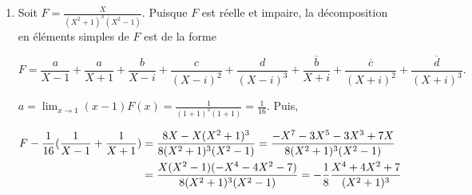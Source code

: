 {{\begin{enumerate}
Puis,

\begin{align*}\ensuremath
d&=\lim_{z \rightarrow i\sqrt{2}}(z-i\sqrt{2})F(z)=\frac{(i\sqrt{2})^2+3}{(i\sqrt{2}-1)^3(i\sqrt{2}+i\sqrt{2})}=
\frac{1}{(2i\sqrt{2})(-2i\sqrt{2}+6+3i\sqrt{2}-1)}=\frac{1}{-4+10i\sqrt{2}}\\
 &=-\frac{2+5i\sqrt{2}}{108}.
\end{align*}

Ensuite,

$$\frac{d}{X-i\sqrt{2}}+\frac{\overline{d}}{X+i\sqrt{2}}=-\frac{1}{108}\frac{(2+5i\sqrt{2})(X+i\sqrt{2})+
(2-5i\sqrt{2})(X-i\sqrt{2})}{X^2+2}=-\frac{1}{108}\frac{4X-20}{X^2+2}=\frac{-X+5}{27(X^2+2)}.$$

Mais alors,

\begin{align*}\ensuremath
\frac{a}{X-1}+\frac{b}{(X-1)^2}+\frac{c}{(X-1)^3}&=\frac{X^2+3}{(X-1)^3(X^2+2)}-\frac{-X+5}{27(X^2+2)}\\
 &=\frac{27(X^2+3)-(-X+5)(X-1)^3}{27(X-1)^3(X^2+2)}=\frac{X^4-8X^3+45X^2-16X+86}{27(X-1)^3(X^2+2)}\\
 &=\frac{(X^2+2)(X^2-8X+43)}{27(X-1)^3(X^2+2)}=\frac{X^2-8X+43}{27(X-1)^3}\\
 &=\frac{X^2-2X+1-6X+6+36}{27(X-1)^3}\\
 &=\frac{1}{27}(\frac{1}{X-1}-6\frac{1}{(X-1)^2}+\frac{36}{(X-1)^3}).
\end{align*}

Finalement,

$$F=\frac{1}{27}(\frac{1}{X-1}-6\frac{1}{(X-1)^2}+\frac{36}{(X-1)^3})-\frac{1}{108}(\frac{2+5i\sqrt{2}}{X-i\sqrt{2}}+\frac{2-5i\sqrt{2}}{X+i\sqrt{2}}).$$

\item  Soit $F=\frac{X}{(X^2+1)^3(X^2-1)}$. Puisque $F$ est réelle et impaire, la décomposition en éléments simples de $F$ est de la forme

$$F=\frac{a}{X-1}+\frac{a}{X+1}+\frac{b}{X-i}+\frac{c}{(X-i)^2}+\frac{d}{(X-i)^3}+\frac{\overline{b}}{X+i}+\frac{\overline{c}}{(X+i)^2}+\frac{\overline{d}}{(X+i)^3}.$$

$a=\lim_{x\rightarrow 1}(x-1)F(x)=\frac{1}{(1+1)^3(1+1)}=\frac{1}{16}$. Puis,

\begin{align*}\ensuremath
F-\frac{1}{16}(\frac{1}{X-1}+\frac{1}{X+1})&=\frac{8X-X(X^2+1)^3}{8(X^2+1)^3(X^2-1)}
=\frac{-X^7-3X^5-3X^3+7X}{8(X^2+1)^3(X^2-1)}\\
 &=\frac{X(X^2-1)(-X^4-4X^2-7)}{8(X^2+1)^3(X^2-1)}=-\frac{1}{8}\frac{X^4+4X^2+7}{(X^2+1)^3}
\end{align*}


\end{enumerate}}}
